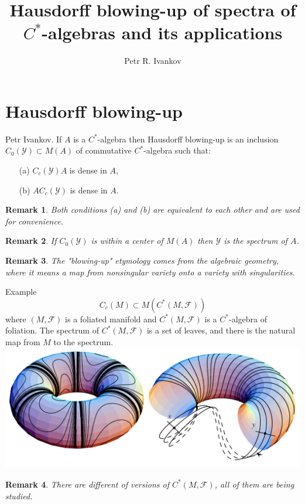 \documentclass{beamer}
\title{Hausdorff blowing-up of spectra of $C^*$-algebras and its applications}
\institute
{
 Noncommutative geometry and topology
}
\author{Petr R. Ivankov  }
\theoremstyle{plain}
\newtheorem{rem}{Remark}
\newcommand{\sF}{\mathcal{F}}       %
\newcommand{\sY}{\mathcal{Y}}       %
\begin{document}
\begin{frame}
  \titlepage
\end{frame}
\section{Hausdorff blowing-up}
\begin{frame}
	\begin{definition}\label{blowing_u_defn}\alert{Petr Ivankov.}
		If $A$ is a $C^*$-algebra then \alert{Hausdorff blowing-up} is an inclusion  $C_0\left( \sY\right) \subset M\left( A\right)$ of commutative $C^*$-algebra such that:
		\begin{enumerate}
			\item[(a)] $C_c\left( \sY\right)A$ is dense in $A$,
			\item [(b)]  $AC_c\left( \sY\right)$ is dense in $A$.
		\end{enumerate} 
	\end{definition}
	\begin{rem}
		Both conditions (a) and (b) are equivalent to each other and are used for convenience.
	\end{rem}
	\begin{rem}
		If $C_0\left( \sY\right)$ is within a center of $M\left( A\right)$ then $\sY$ is the spectrum of $A$.
	\end{rem}
	\begin{rem}
		The "\alert{blowing-up}" etymology comes from the algebraic geometry, where it means a map from nonsingular variety  onto a variety with singularities.
	\end{rem}
\end{frame}
\begin{frame}
\huge{Example} \normalsize	$~$\\ $$C_c\left(M \right) \subset M\left( C^*\left(M, \sF \right)\right) $$  where 
	$\left(M, \sF \right)$ is a foliated manifold and  $C^*\left(M, \sF \right)$ is a $C^*$-algebra of foliation. The spectrum of $C^*\left(M, \sF \right)$ is a set of leaves, and there is the natural map from $M$ to the spectrum.
\\
\includegraphics[scale=0.25]{Untitled.png}
\begin{rem}
There are different of versions of $ C^*\left(M, \sF \right)$, all of them are being studied.
\end{rem}
\end{frame}
\end{document}
